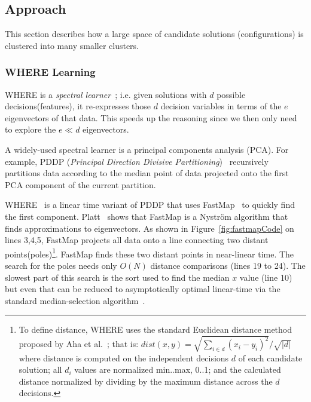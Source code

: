 \documentclass{sig-alternative}
\newcommand{\fig}[1]{Figure~\ref{fig:#1}}
\begin{document}
\subsection{Approach}
This section describes how a large space of candidate solutions (configurations) is clustered into many smaller clusters.
\subsubsection{WHERE Learning}\label{sec:spectral}


WHERE is a {\em spectral learner}~\cite{kamvar2003spectral}; i.e. given solutions with $d$ possible decisions(features), it re-expresses those $d$ decision variables in terms of the $e$ eigenvectors of that data.
This speeds up the reasoning since we then only need to explore the $e\ll d$   eigenvectors.

A widely-used spectral learner is a principal components analysis (PCA). For example, PDDP ({\em Principal Direction Divisive Partitioning})~\cite{boley1998principal} recursively partitions data according to the median point of data projected onto the first PCA component of the current partition.

WHERE~\cite{me12d} is a linear time variant of PDDP  
that uses FastMap~\cite{Faloutsos1995} to quickly find the first component.
Platt~\cite{platt05} shows that FastMap is a  Nystr\"om algorithm that finds approximations to eigenvectors.
As shown in \fig{fastmapCode} on lines 3,4,5, FastMap  projects all data onto a line connecting two distant points(poles)\footnote{
To define distance, WHERE uses the standard Euclidean distance method proposed by Aha et al.~\cite{aha91}; that is: $dist(x,y)= \sqrt{\sum_{i\in d} (x_i - y_i)^2}/\sqrt{ \left\vert{d}\right\vert }$ where distance is computed on the independent decisions $d$ of each candidate solution; all $d_i$ values are normalized min..max, 0..1; and the calculated distance normalized by dividing by the maximum distance across the $d$ decisions.}. 
FastMap finds these two distant points in near-linear time. 
The search for the poles needs only $O(N)$ distance comparisons (lines 19 to 24).
The slowest part of this search is the sort used to find the median $x$ value (line 10) but even that can be reduced to  asymptotically optimal linear-time via the standard median-selection algorithm~\cite{hoare61}.
\end{document}
